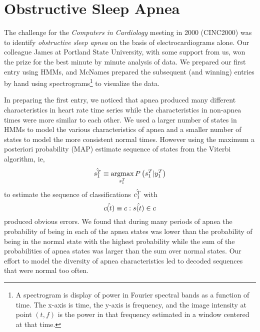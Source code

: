 
\chapter{Obstructive Sleep Apnea}
\label{chap:apnea}

The challenge for the \emph{Computers in Cardiology} %
%
meeting in 2000 (CINC2000) %
%
was to identify \emph{obstructive sleep apnea} on the basis of
electrocardiograms alone.  Our colleague James  at
Portland State University, with some support from us, won the prize
for the best minute by minute analysis of data.  We prepared our first
entry using HMMs, and McNames prepared the subsequent (and winning)
entries by hand using spectrograms\footnote{A spectrogram is display
  of power in Fourier spectral bands as a function of time.  The
  x-axis is time, the y-axis is frequency, and the image intensity at
  point $(t,f)$ is the power in that frequency estimated in a window
  centered at that time.} to visualize the data.  

In preparing the first entry, we noticed that apnea produced many
different characteristics in heart rate time series while the
characteristics in non-apnea times were more similar to each other.  We
used a larger number of states in HMMs to model the various
characteristics of apnea and a smaller number of states to model the
more consistent normal times.  However using the maximum a posteriori
probability (MAP) estimate sequence of states from the Viterbi
algorithm, ie,
\begin{equation*}
  \hat {s_{1}^{T}} \equiv
  \operatorname*{argmax}_{s_{1}^{T}}P\left(s_{1}^{T} | y_{1}^{T} \right)
\end{equation*}
to estimate the sequence of classifications $\hat {c_{1}^{T}}$ with
\begin{equation*}
  \hat {{c}{(t)}} \equiv c:\hat {{s}{(t)}} \in c
\end{equation*}
produced obvious errors.  We found that during many periods of apnea
the probability of being in each of the apnea states was lower than
the probability of being in the normal state with the highest
probability while the sum of the probabilities of apnea states was
larger than the sum over normal states.  Our effort to model the
diversity of apnea characteristics led to decoded sequences that were
normal too often.

